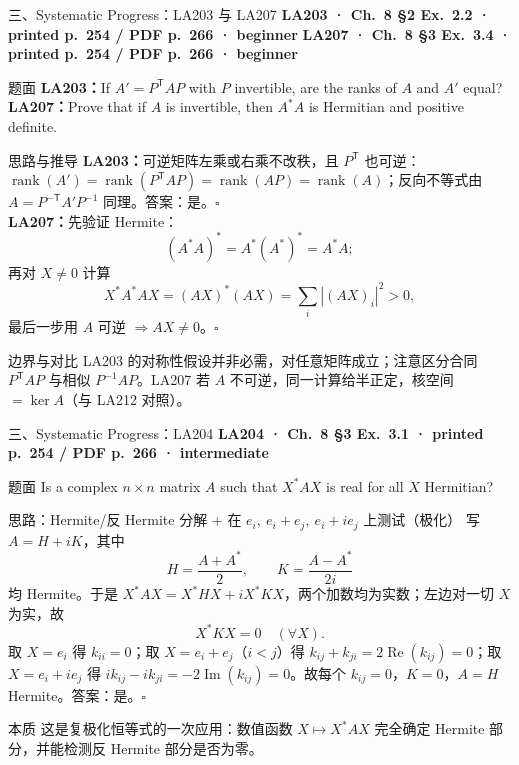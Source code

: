 \documentclass[aspectratio=169,10pt,fontset=none]{ctexbeamer}
\newcommand{\ex}[1]{\textcolor{accent}{\footnotesize\bfseries #1}}
\begin{document}
\begin{frame}[t]{三、Systematic Progress：LA203 与 LA207}
  \leavevmode\ex{LA203 · Ch.~8 §2 Ex.~2.2 · printed p.~254 / PDF p.~266 · beginner}\quad
  \ex{LA207 · Ch.~8 §3 Ex.~3.4 · printed p.~254 / PDF p.~266 · beginner}
  \begin{block}{\footnotesize 题面}
    \scriptsize \textbf{LA203：}If $A'=P^{\mathsf T}AP$ with $P$ invertible, are the ranks of $A$ and $A'$ equal?\\
    \textbf{LA207：}Prove that if $A$ is invertible, then $A^*A$ is Hermitian and positive definite.
  \end{block}
  \begin{exampleblock}{\footnotesize 思路与推导}
    \scriptsize
    \textbf{LA203：}可逆矩阵左乘或右乘不改秩，且 $P^{\mathsf T}$ 也可逆：$\operatorname{rank}(A')=\operatorname{rank}(P^{\mathsf T}AP)=\operatorname{rank}(AP)=\operatorname{rank}(A)$；反向不等式由 $A=P^{-\mathsf T}A'P^{-1}$ 同理。答案：是。$\square$\\[3pt]
    \textbf{LA207：}先验证 Hermite：
    $$(A^*A)^*=A^*(A^*)^*=A^*A;$$
    再对 $X\ne0$ 计算
    $$X^*A^*AX=(AX)^*(AX)=\sum_i|(AX)_i|^2>0,$$
    最后一步用 $A$ 可逆 $\Rightarrow AX\ne0$。$\square$
  \end{exampleblock}
  \begin{block}{\footnotesize 边界与对比}
    \scriptsize LA203 的对称性假设并非必需，对任意矩阵成立；注意区分合同 $P^{\mathsf T}AP$ 与相似 $P^{-1}AP$。LA207 若 $A$ 不可逆，同一计算给半正定，核空间 $=\ker A$（与 LA212 对照）。
  \end{block}
\end{frame}

\begin{frame}[t]{三、Systematic Progress：LA204}
  \leavevmode\ex{LA204 · Ch.~8 §3 Ex.~3.1 · printed p.~254 / PDF p.~266 · intermediate}
  \begin{block}{\footnotesize 题面}
    \scriptsize Is a complex $n\times n$ matrix $A$ such that $X^*AX$ is real for all $X$ Hermitian?
  \end{block}
  \begin{exampleblock}{\footnotesize 思路：Hermite/反 Hermite 分解 + 在 $e_i,\ e_i+e_j,\ e_i+ie_j$ 上测试（极化）}
    \scriptsize
    写 $A=H+iK$，其中
    $$H=\frac{A+A^*}2,\qquad K=\frac{A-A^*}{2i}$$
    均 Hermite。于是 $X^*AX=X^*HX+iX^*KX$，两个加数均为实数；左边对一切 $X$ 为实，故
    $$X^*KX=0\quad(\forall X).$$
    取 $X=e_i$ 得 $k_{ii}=0$；取 $X=e_i+e_j$（$i<j$）得 $k_{ij}+k_{ji}=2\operatorname{Re}(k_{ij})=0$；取 $X=e_i+ie_j$ 得 $ik_{ij}-ik_{ji}=-2\operatorname{Im}(k_{ij})=0$。故每个 $k_{ij}=0$，$K=0$，$A=H$ Hermite。答案：是。$\square$
  \end{exampleblock}
  \begin{block}{\footnotesize 本质}
    \scriptsize 这是复极化恒等式的一次应用：数值函数 $X\mapsto X^*AX$ 完全确定 Hermite 部分，并能检测反 Hermite 部分是否为零。
  \end{block}
\end{frame}
\end{document}
